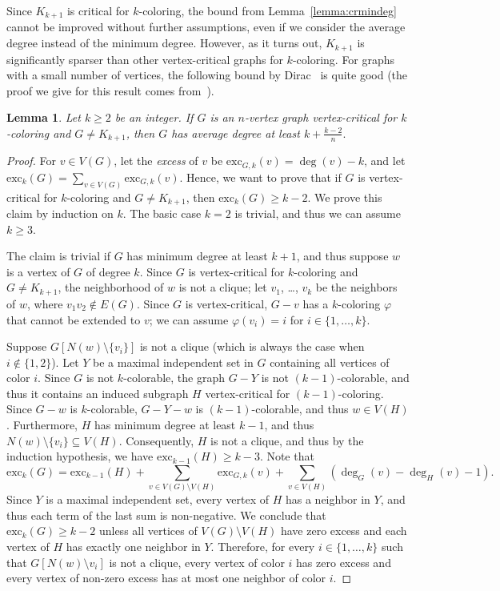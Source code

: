 \documentclass[12pt,twoside,openright,a4paper]{book}
\newtheorem{lemma}[theorem]{Lemma}
\newcommand{\exc}{\text{exc}}
\begin{document}
Since $K_{k+1}$ is critical for $k$-coloring, the bound from Lemma~\ref{lemma:crmindeg} cannot be improved without
further assumptions, even if we consider the average degree instead of the minimum degree.
However, as it turns out, $K_{k+1}$ is significantly sparser than other vertex-critical graphs for $k$-coloring.
For graphs with a small number of vertices, the following bound by Dirac~\cite{diracdens} is quite good
(the proof we give for this result comes from~\cite{weinstein}).
\begin{lemma}\label{lemma:diracdens}
Let $k\ge 2$ be an integer.  If $G$ is an $n$-vertex graph vertex-critical for $k$-coloring and $G\neq K_{k+1}$, then $G$ has average degree
at least $k+\tfrac{k-2}{n}.$
\end{lemma}
\begin{proof}
For $v\in V(G)$, let the \emph{excess} of $v$ be $\exc_{G,k}(v)=\deg(v)-k$, and let $\exc_k(G)=\sum_{v\in V(G)} \exc_{G,k}(v)$.
Hence, we want to prove that if $G$ is vertex-critical for $k$-coloring and $G\neq K_{k+1}$, then $\exc_k(G)\ge k-2$.  We prove this claim by induction on $k$.
The basic case $k=2$ is trivial, and thus we can assume $k\ge 3$.

The claim is trivial if $G$ has minimum degree at least $k+1$, and thus suppose $w$ is a vertex of $G$ of degree $k$.  Since $G$ is vertex-critical for $k$-coloring and $G\neq K_{k+1}$,
the neighborhood of $w$ is not a clique; let $v_1$, \ldots, $v_k$ be the neighbors of $w$, where $v_1v_2\not\in E(G)$.  Since $G$ is vertex-critical, $G-v$ has a $k$-coloring $\varphi$ that cannot
be extended to $v$; we can assume $\varphi(v_i)=i$ for $i\in\{1,\ldots,k\}$.

Suppose $G[N(w)\setminus\{v_i\}]$ is not a clique (which is always the case when $i\not\in\{1,2\}$).  Let $Y$ be a maximal independent set in $G$ containing all vertices of color $i$.
Since $G$ is not $k$-colorable, the graph $G-Y$ is not $(k-1)$-colorable, and thus it contains an induced subgraph $H$ vertex-critical for $(k-1)$-coloring.
Since $G-w$ is $k$-colorable, $G-Y-w$ is $(k-1)$-colorable, and thus $w\in V(H)$.  Furthermore, $H$ has minimum degree at least $k-1$, and thus $N(w)\setminus\{v_i\}\subseteq V(H)$.
Consequently, $H$ is not a clique, and thus by the induction hypothesis, we have $\exc_{k-1}(H)\ge k-3$.  Note that
$$\exc_k(G)=\exc_{k-1}(H)+\sum_{v\in V(G)\setminus V(H)} \exc_{G,k}(v)+\sum_{v\in V(H)} (\deg_G(v)-\deg_H(v)-1).$$
Since $Y$ is a maximal independent set, every vertex of $H$ has a neighbor in $Y$, and thus each term of the last sum is non-negative.
We conclude that $\exc_k(G)\ge k-2$ unless all vertices of $V(G)\setminus V(H)$ have zero excess and each vertex of $H$ has exactly one neighbor in $Y$.
Therefore, for every $i\in \{1,\ldots,k\}$ such that $G[N(w)\setminus v_i]$ is not a clique, every vertex of color $i$ has zero excess and every vertex of non-zero excess has at most one neighbor
of color $i$.


\end{proof}
\end{document}
